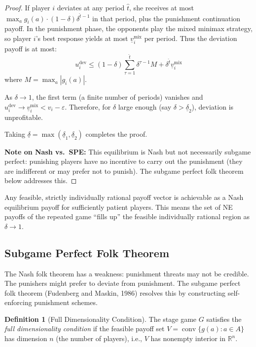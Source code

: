 \documentclass[11pt,a4paper]{article}
\theoremstyle{definition}
\newtheorem{definition}{Definition}[section]
\theoremstyle{plain}
\theoremstyle{remark}
\newcommand{\R}{\mathbb{R}}
\DeclareMathOperator{\conv}{conv}
\begin{document}
\begin{proof}
If player $i$ deviates at any period $\hat{t}$, she receives at most
$\max_a g_i(a) \cdot (1-\delta)\delta^{\hat{t}-1}$ in that period, plus the punishment
continuation payoff. In the punishment phase, the opponents play the mixed minimax strategy,
so player $i$'s best response yields at most $\underline{v}_i^{\text{mix}}$ per period.
Thus the deviation payoff is at most:
\[
    u_i^{\text{dev}} \leq (1-\delta) \sum_{\tau=1}^{\hat{t}} \delta^{\tau-1} M
    + \delta^{\hat{t}} \underline{v}_i^{\text{mix}}
\]
where $M = \max_a |g_i(a)|$.

As $\delta \to 1$, the first term (a finite number of periods) vanishes and
$u_i^{\text{dev}} \to \underline{v}_i^{\text{mix}} < v_i - \varepsilon$. Therefore,
for $\delta$ large enough (say $\delta > \underline{\delta}_2$), deviation is unprofitable.

Taking $\underline{\delta} = \max(\underline{\delta}_1, \underline{\delta}_2)$ completes
the proof.

\textbf{Note on Nash vs.\ SPE:} This equilibrium is Nash but not necessarily subgame
perfect: punishing players have no incentive to carry out the punishment (they are
indifferent or may prefer not to punish). The subgame perfect folk theorem below addresses
this.
\end{proof}

\begin{keyresult}
Any feasible, strictly individually rational payoff vector is achievable as a Nash
equilibrium payoff for sufficiently patient players. This means the set of NE payoffs
of the repeated game ``fills up'' the feasible individually rational region as
$\delta \to 1$.
\end{keyresult}

\subsection{Subgame Perfect Folk Theorem}

The Nash folk theorem has a weakness: punishment threats may not be credible. The punishers
might prefer to deviate from punishment. The subgame perfect folk theorem (Fudenberg and
Maskin, 1986) resolves this by constructing self-enforcing punishment schemes.

\begin{definition}[Full Dimensionality Condition]
\label{def:full-dim}
The stage game $G$ satisfies the \emph{full dimensionality condition} if the feasible payoff
set $V = \conv\{g(a) : a \in A\}$ has dimension $n$ (the number of players), i.e.,
$V$ has nonempty interior in $\R^n$.
\end{definition}
\end{document}
